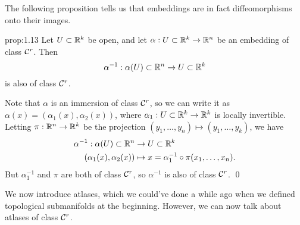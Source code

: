 The following proposition tells us that embeddings are in fact 
diffeomorphisms onto their images. 
\begin{prop}{prop:1.13}
    Let $U \subset \mathbb{R}^k$ be open, and let $\alpha : U \subset \mathbb{R}^k \to 
    \mathbb{R}^n$ be an embedding of class ${\cal C}^r$. Then 
    \[ \alpha^{-1} : \alpha(U) \subset \mathbb{R}^n \to U \subset \mathbb{R}^k \] 
    is also of class ${\cal C}^r$. 
\end{prop}\vspace{-0.25cm}
\begin{pf}
    Note that $\alpha$ is an immersion of class ${\cal C}^r$, so we can write it as 
    $\alpha(x) = (\alpha_1(x), \alpha_2(x))$,
    where $\alpha_1 : U \subset \mathbb{R}^k \to \mathbb{R}^k$ is locally invertible. 
    Letting $\pi : \mathbb{R}^n \to \mathbb{R}^k$ be the projection $(y_1, \dots, y_n) 
    \mapsto (y_1, \dots, y_k)$, we have 
    \begin{align*} 
        \alpha^{-1} : \alpha(U) \subset \mathbb{R}^n &\to U \subset \mathbb{R}^k \\ 
        (\alpha_1(x), \alpha_2(x)) &\mapsto x = \alpha_1^{-1} \circ 
        \pi(x_1, \dots, x_n).
    \end{align*}
    But $\alpha_1^{-1}$ and $\pi$ are both of class ${\cal C}^r$, so 
    $\alpha^{-1}$ is also of class ${\cal C}^r$. \qed 
\end{pf}\vspace{-0.25cm}
We now introduce atlases, which we could've done a while ago when we 
defined topological submanifolds at the beginning. However, we can now 
talk about atlases of class ${\cal C}^r$.

